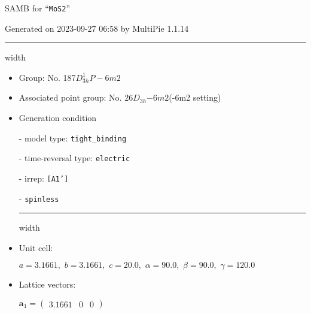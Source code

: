 \documentclass[fleqn,10pt,landscape]{article}
\begin{document}
\setcounter{MaxMatrixCols}{16}

\setlength{\baselineskip}{16pt}
\footnotesize
\begin{center}
\LARGE
SAMB for ``\texttt{MoS2}''
\end{center}
\begin{flushright}
Generated on 2023-09-27 06:58 by MultiPie 1.1.14
\end{flushright}
\vspace{1cm}


 \hfil \hrule height 1mm width \textwidth \hfil

\begin{itemize}
\item Group: No. 187\quad$D_{3h}^{1}$\quad$P-6m2$\quad[ hexagonal ]

\item Associated point group: No. 26\quad$D_{3h}$\quad$-6m2$\quad(-6m2 setting)\quad[ hexagonal ]

\vspace{5mm}

\item Generation condition

\quad - model type: \texttt{tight_binding}

\quad - time-reversal type: \texttt{electric}

\quad - irrep: \texttt{[A1']}

\quad - \texttt{spinless}


 \hfil \hrule height 1mm width \textwidth \hfil

\item Unit cell:

\quad $a=3.1661,\,\, b=3.1661,\,\, c=20.0,\,\, \alpha=90.0,\,\, \beta=90.0,\,\, \gamma=120.0$

\item Lattice vectors:

\quad $\bm{a}_1=\begin{pmatrix} 3.1661 & 0 & 0 \end{pmatrix}$


\end{itemize}
\end{document}
